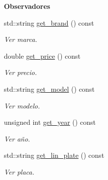 \begin{Indent}{\bf Observadores}\par
\begin{DoxyCompactItemize}
\item 
std\+::string \hyperlink{class_cautomobile_a2194e32fb5aeaf71dea2a346db3d75e0}{get\+\_\+brand} () const 
\begin{DoxyCompactList}\small\item\em Ver marca. \end{DoxyCompactList}\item 
double \hyperlink{class_cautomobile_aa1271b8e3583809af8a00f0989d3ef10}{get\+\_\+price} () const 
\begin{DoxyCompactList}\small\item\em Ver precio. \end{DoxyCompactList}\item 
std\+::string \hyperlink{class_cautomobile_a5ab4c602bf31488b19e7a2d5240a96ef}{get\+\_\+model} () const 
\begin{DoxyCompactList}\small\item\em Ver modelo. \end{DoxyCompactList}\item 
unsigned int \hyperlink{class_cautomobile_adba2be0026ebbeeb1c695f4994b962f3}{get\+\_\+year} () const 
\begin{DoxyCompactList}\small\item\em Ver año. \end{DoxyCompactList}\item 
std\+::string \hyperlink{class_cautomobile_a33087bf4433b9ffc1b43edba6bb68f12}{get\+\_\+lin\+\_\+plate} () const 
\begin{DoxyCompactList}\small\item\em Ver placa. \end{DoxyCompactList}\end{DoxyCompactItemize}
\end{Indent}
